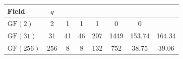 \begin{tabular}{l@{\hspace*{1em}}S[table-format=3]@{\hspace*{1em}}S[table-format=2]S[table-format=2]S[table-format=3]S[table-format=4]@{\hspace*{1em}}S[table-format=3.2]@{\hspace*{1em}}S[table-format=3.2]}
\toprule
{Field} & {\(q\)} & {} & {} & {} & {} & {} & {} \\
\midrule
$\text{GF}(2)$ & 2 & 1 & 1 & 1 & 0 & 0 & \text{--} \\
$\text{GF}(31)$ & 31 & 41 & 46 & 207 & 1449 & 153.74 & 164.34 \\
$\text{GF}(256)$ & 256 & 8 & 8 & 132 & 752 & 38.75 & 39.06 \\
\bottomrule
\end{tabular}
